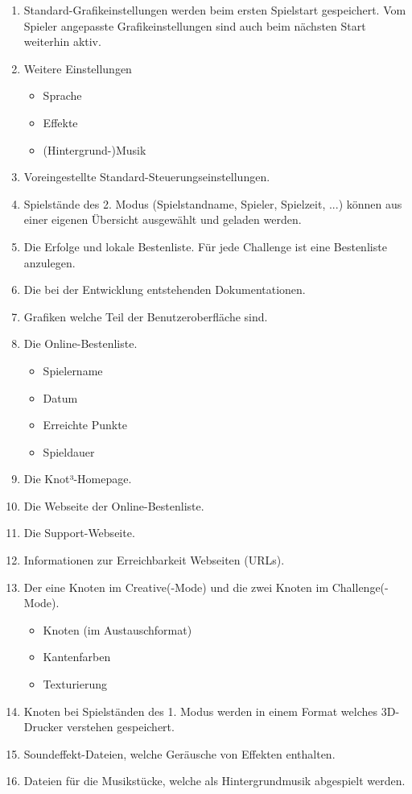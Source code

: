 \begin{enumerate}
\item Standard-Grafikeinstellungen werden beim ersten Spielstart gespeichert. Vom Spieler angepasste Grafikeinstellungen sind auch beim nächsten Start weiterhin aktiv.

\item Weitere Einstellungen

  \begin{itemize}
     \item Sprache
     \item Effekte
     \item (Hintergrund-)Musik
  \end{itemize}

\item Voreingestellte Standard-Steuerungseinstellungen.
\item {\color{red}Spielstände des 2. Modus (Spielstandname, Spieler, Spielzeit, ...) können aus einer eigenen Übersicht ausgewählt und geladen werden.}
\item Die Erfolge und lokale Bestenliste. Für jede Challenge ist eine Bestenliste anzulegen.
\item Die bei der  Entwicklung entstehenden Dokumentationen.
\item Grafiken welche Teil der Benutzeroberfläche sind.
\item Die Online-Bestenliste.

  \begin{itemize}
     \item Spielername
     \item Datum
     \item Erreichte Punkte
     \item Spieldauer
  \end{itemize}
  
\item Die Knot³-Homepage.
\item Die Webseite der Online-Bestenliste.
\item Die Support-Webseite.
\item Informationen zur Erreichbarkeit Webseiten (URLs).
\item Der eine Knoten im Creative(-Mode) und die zwei Knoten im Challenge(-Mode).

  \begin{itemize}
     \item Knoten (im Austauschformat)
     \item Kantenfarben
     \item Texturierung
  \end{itemize}
  
\item Knoten bei Spielständen des 1. Modus werden in einem Format welches 3D-Drucker verstehen gespeichert.
\item Soundeffekt-Dateien, welche Geräusche von Effekten enthalten.
\item Dateien für die Musikstücke, welche als Hintergrundmusik abgespielt werden.



\end{enumerate}

